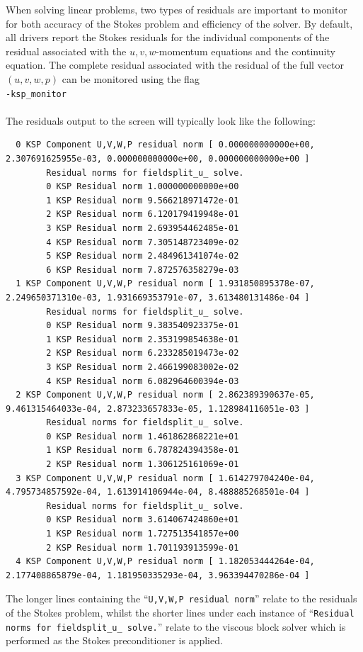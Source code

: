 \documentclass[paper=a4, fontsize=10pt,twoside]{scrartcl}
\newcommand{\shellcmd}[1]{\\\indent\indent\texttt{\hspace{5mm}\footnotesize #1}\\}
\begin{document}
When solving linear problems, two types of residuals are important to monitor for both accuracy of the Stokes problem and efficiency of the solver.
By default, all drivers report the Stokes residuals for the individual components of the residual associated with the $u,v,w$-momentum equations and the continuity equation. The complete residual associated with the residual of the full vector $(u,v,w,p)$ can be monitored using the flag
\shellcmd{-ksp\_monitor}
\\[8pt]
The residuals output to the screen will typically look like the following:
\begingroup
    \fontsize{6.5pt}{6.5pt}\selectfont
	\begin{verbatim}
  0 KSP Component U,V,W,P residual norm [ 0.000000000000e+00, 2.307691625955e-03, 0.000000000000e+00, 0.000000000000e+00 ]
        Residual norms for fieldsplit_u_ solve.
        0 KSP Residual norm 1.000000000000e+00
        1 KSP Residual norm 9.566218971472e-01
        2 KSP Residual norm 6.120179419948e-01
        3 KSP Residual norm 2.693954462485e-01
        4 KSP Residual norm 7.305148723409e-02
        5 KSP Residual norm 2.484961341074e-02
        6 KSP Residual norm 7.872576358279e-03
  1 KSP Component U,V,W,P residual norm [ 1.931850895378e-07, 2.249650371310e-03, 1.931669353791e-07, 3.613480131486e-04 ]
        Residual norms for fieldsplit_u_ solve.
        0 KSP Residual norm 9.383540923375e-01
        1 KSP Residual norm 2.353199854638e-01
        2 KSP Residual norm 6.233285019473e-02
        3 KSP Residual norm 2.466199083002e-02
        4 KSP Residual norm 6.082964600394e-03
  2 KSP Component U,V,W,P residual norm [ 2.862389390637e-05, 9.461315464033e-04, 2.873233657833e-05, 1.128984116051e-03 ]
        Residual norms for fieldsplit_u_ solve.
        0 KSP Residual norm 1.461862868221e+01
        1 KSP Residual norm 6.787824394358e-01
        2 KSP Residual norm 1.306125161069e-01
  3 KSP Component U,V,W,P residual norm [ 1.614279704240e-04, 4.795734857592e-04, 1.613914106944e-04, 8.488885268501e-04 ]
        Residual norms for fieldsplit_u_ solve.
        0 KSP Residual norm 3.614067424860e+01
        1 KSP Residual norm 1.727513541857e+00
        2 KSP Residual norm 1.701193913599e-01
  4 KSP Component U,V,W,P residual norm [ 1.182053444264e-04, 2.177408865879e-04, 1.181950335293e-04, 3.963394470286e-04 ]
	\end{verbatim}
\endgroup
The longer lines containing the ``{\tt U,V,W,P residual norm}'' relate to the residuals of the Stokes problem, whilst the shorter lines under each instance of ``{\tt Residual norms for fieldsplit\_u\_ solve.}'' relate to the viscous block solver which is performed as the Stokes preconditioner is applied.
\end{document}
